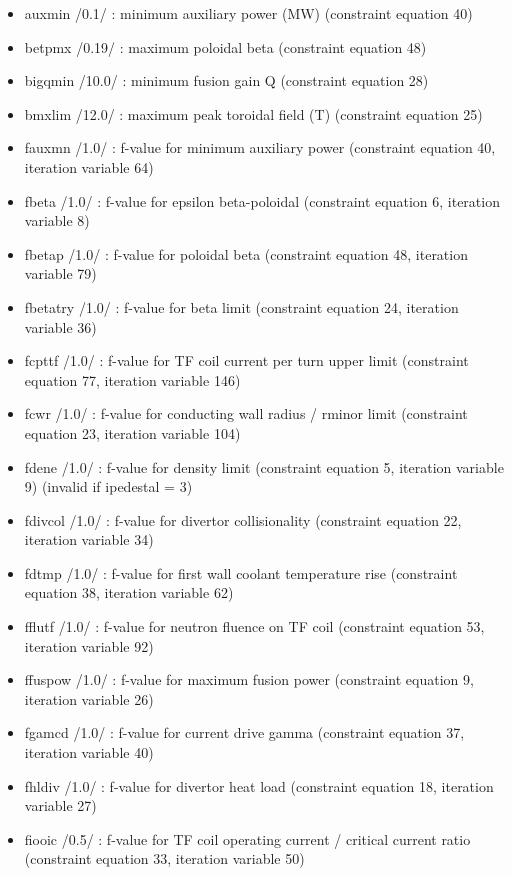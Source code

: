 \documentclass[]{article}
\providecommand{\tightlist}{%
  \setlength{\itemsep}{0pt}\setlength{\parskip}{0pt}}
\begin{document}
\begin{itemize}
\tightlist
\item
  auxmin /0.1/ : minimum auxiliary power (MW) (constraint equation 40)
\item
  betpmx /0.19/ : maximum poloidal beta (constraint equation 48)
\item
  bigqmin /10.0/ : minimum fusion gain Q (constraint equation 28)
\item
  bmxlim /12.0/ : maximum peak toroidal field (T) (constraint equation
  25)
\item
  fauxmn /1.0/ : f-value for minimum auxiliary power (constraint
  equation 40, iteration variable 64)
\item
  fbeta /1.0/ : f-value for epsilon beta-poloidal (constraint equation
  6, iteration variable 8)
\item
  fbetap /1.0/ : f-value for poloidal beta (constraint equation 48,
  iteration variable 79)
\item
  fbetatry /1.0/ : f-value for beta limit (constraint equation 24,
  iteration variable 36)
\item
  fcpttf /1.0/ : f-value for TF coil current per turn upper limit
  (constraint equation 77, iteration variable 146)
\item
  fcwr /1.0/ : f-value for conducting wall radius / rminor limit
  (constraint equation 23, iteration variable 104)
\item
  fdene /1.0/ : f-value for density limit (constraint equation 5,
  iteration variable 9) (invalid if ipedestal = 3)
\item
  fdivcol /1.0/ : f-value for divertor collisionality (constraint
  equation 22, iteration variable 34)
\item
  fdtmp /1.0/ : f-value for first wall coolant temperature rise
  (constraint equation 38, iteration variable 62)
\item
  fflutf /1.0/ : f-value for neutron fluence on TF coil (constraint
  equation 53, iteration variable 92)
\item
  ffuspow /1.0/ : f-value for maximum fusion power (constraint equation
  9, iteration variable 26)
\item
  fgamcd /1.0/ : f-value for current drive gamma (constraint equation
  37, iteration variable 40)
\item
  fhldiv /1.0/ : f-value for divertor heat load (constraint equation 18,
  iteration variable 27)
\item
  fiooic /0.5/ : f-value for TF coil operating current / critical
  current ratio (constraint equation 33, iteration variable 50)

\end{itemize}
\end{document}

